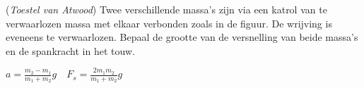 



\item{}\begin{minipage}[t]{.7\textwidth}
(\emph{Toestel van Atwood}) Twee verschillende massa's zijn via een katrol van te verwaarlozen massa met elkaar verbonden zoals in de figuur. De wrijving is eveneens te verwaarlozen. 
\newline
\newline
Bepaal de grootte van de versnelling van beide massa's en de spankracht in het touw.
\end{minipage}
\hfill
\begin{minipage}[t]{.2\textwidth}
\flushright
\end{minipage}

\begin{oplossing}
$a=\frac{m_2-m_1}{m_1+m_2}g \quad F_s=\frac{2m_1m_2}{m_1+m_2}g$
\end{oplossing}